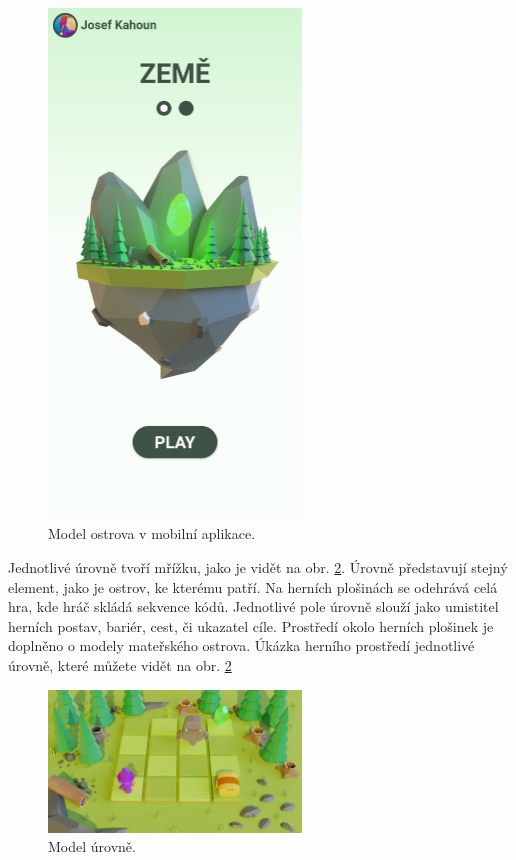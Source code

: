 \begin{figure}[h]
    \centering
    \includegraphics[width=0.6\textwidth]{img/mobilni-aplikace-ostrov.jpg}
    \caption{Model ostrova v mobilní aplikace.}
    \label{fig:mobilni-aplikace-ostrov}
\end{figure}

Jednotlivé úrovně tvoří mřížku, jako je vidět na obr. \ref{fig:model-levelu}. Úrovně představují stejný element, jako je ostrov, ke kterému patří. Na herních plošinách se odehrává celá hra, kde hráč skládá sekvence kódů. Jednotlivé pole úrovně slouží jako umistitel herních postav, bariér, cest, či ukazatel cíle. Prostředí okolo herních plošinek je doplněno o modely mateřského ostrova. Úkázka herního prostředí jednotlivé úrovně, které můžete vidět na obr. \ref{fig:model-levelu}

\begin{figure}[h]
    \centering
    \includegraphics[width=0.6\textwidth]{img/model-levelu.png}
    \caption{Model úrovně.}
    \label{fig:model-levelu}
\end{figure}